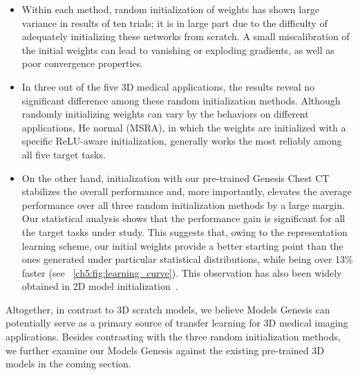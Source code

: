 \begin{itemize}
    \item Within each method, random initialization of weights has shown large variance in results of ten trials; it is in large part due to the difficulty of adequately initializing these networks from scratch. A small miscalibration of the initial weights can lead to vanishing or exploding gradients, as well as poor convergence properties. 
    \item In three out of the five 3D medical applications, the results reveal no significant difference among these random initialization methods. Although randomly initializing weights can vary by the behaviors on different applications, He normal (MSRA), in which the weights are initialized with a specific ReLU-aware initialization, generally works the most reliably among all five target tasks.
    \item On the other hand, initialization with our pre-trained Genesis Chest CT stabilizes the overall performance and, more importantly, elevates the average performance over all three random initialization methods by a large margin. Our statistical analysis shows that the performance gain is significant for all the target tasks under study. This suggests that, owing to the representation learning scheme, our initial weights provide a better starting point than the ones generated under particular statistical distributions, while being over 13\% faster (see \figurename~\ref{ch5:fig:learning_curve}). This observation has also been widely obtained in 2D model initialization~\citep{tajbakhsh2016convolutional,shin2016deep,rawat2017deep,zhou2017fine,voulodimos2018deep}.
\end{itemize}

Altogether, in contrast to 3D scratch models, we believe Models Genesis can potentially serve as a primary source of transfer learning for 3D medical imaging applications. Besides contrasting with the three random initialization methods, we further examine our Models Genesis against the existing pre-trained 3D models in the coming section.




